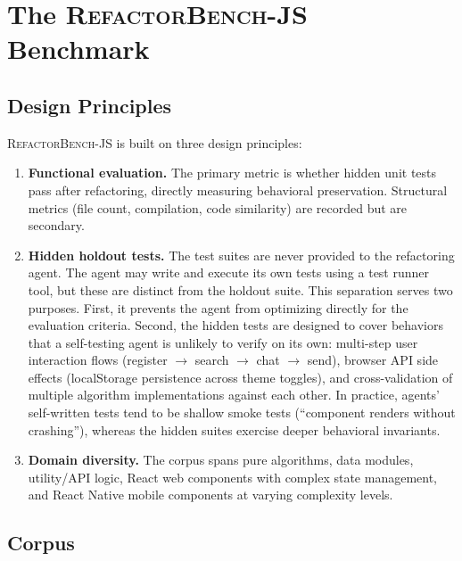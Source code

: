 \documentclass[11pt,letterpaper]{article}
\begin{document}
\section{The \textsc{RefactorBench}-JS Benchmark}
\label{sec:benchmark}

\subsection{Design Principles}

\textsc{RefactorBench}-JS is built on three design principles:

\begin{enumerate}[leftmargin=2em]
\item \textbf{Functional evaluation.} The primary metric is whether hidden unit tests pass after refactoring, directly measuring behavioral preservation. Structural metrics (file count, compilation, code similarity) are recorded but are secondary.

\item \textbf{Hidden holdout tests.} The test suites are never provided to the refactoring agent. The agent may write and execute its own tests using a test runner tool, but these are distinct from the holdout suite. This separation serves two purposes. First, it prevents the agent from optimizing directly for the evaluation criteria. Second, the hidden tests are designed to cover behaviors that a self-testing agent is unlikely to verify on its own: multi-step user interaction flows (register $\rightarrow$ search $\rightarrow$ chat $\rightarrow$ send), browser API side effects (localStorage persistence across theme toggles), and cross-validation of multiple algorithm implementations against each other. In practice, agents' self-written tests tend to be shallow smoke tests (``component renders without crashing''), whereas the hidden suites exercise deeper behavioral invariants.

\item \textbf{Domain diversity.} The corpus spans pure algorithms, data modules, utility/API logic, React web components with complex state management, and React Native mobile components at varying complexity levels.
\end{enumerate}

\subsection{Corpus}
\end{document}
